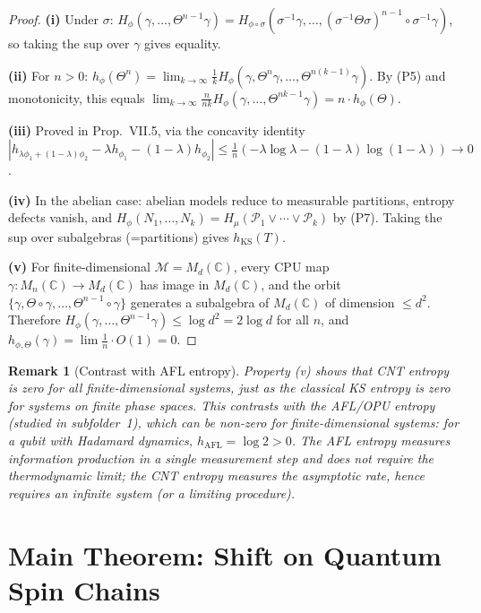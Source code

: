 \documentclass[12pt,a4paper]{article}
\newtheorem{remark}[theorem]{Remark}
\newcommand{\CC}{\mathbb{C}}
\newcommand{\Mn}{M_n(\CC)}
\newcommand{\Md}{M_d(\CC)}
\newcommand{\vN}{\mathcal{M}}      %
\newcommand{\thetaaut}{\Theta}
\newcommand{\Hphi}{H_{\phi}}
\newcommand{\hphi}{h_{\phi}}
\begin{document}
\begin{proof}
\textbf{(i)} Under $\sigma$: $\Hphi(\gamma,\ldots,\thetaaut^{n-1}\gamma)=
H_{\phi\circ\sigma}(\sigma^{-1}\gamma,\ldots,(\sigma^{-1}\thetaaut\sigma)^{n-1}\circ\sigma^{-1}\gamma)$,
so taking the sup over $\gamma$ gives equality.

\textbf{(ii)} For $n>0$: $h_\phi(\thetaaut^n)=\lim_{k\to\infty}\frac{1}{k}
\Hphi(\gamma,\thetaaut^n\gamma,\ldots,\thetaaut^{n(k-1)}\gamma)$.  By (P5) and
monotonicity, this equals $\lim_{k\to\infty}\frac{n}{nk}\Hphi(\gamma,\ldots,\thetaaut^{nk-1}\gamma)
=n\cdot\hphi(\thetaaut)$.

\textbf{(iii)} Proved in \cite{cnt87} Prop.~VII.5, via the concavity identity
$|h_{\lambda\phi_1+(1-\lambda)\phi_2}-\lambda h_{\phi_1}-(1-\lambda)h_{\phi_2}|
\le\frac{1}{n}(-\lambda\log\lambda-(1-\lambda)\log(1-\lambda))\to 0$.

\textbf{(iv)} In the abelian case: abelian models reduce to measurable partitions, entropy
defects vanish, and $\Hphi(N_1,\ldots,N_k)=H_\mu(\mathcal{P}_1\vee\cdots\vee\mathcal{P}_k)$ by (P7).
Taking the sup over subalgebras (=partitions) gives $h_{\mathrm{KS}}(T)$.

\textbf{(v)} For finite-dimensional $\vN=\Md$, every CPU map $\gamma:\Mn\to\Md$ has image
in $\Md$, and the orbit $\{\gamma,\thetaaut\circ\gamma,\ldots,\thetaaut^{n-1}\circ\gamma\}$
generates a subalgebra of $\Md$ of dimension $\le d^2$.  Therefore
$\Hphi(\gamma,\ldots,\thetaaut^{n-1}\gamma)\le\log d^2=2\log d$ for all $n$, and
$h_{\phi,\thetaaut}(\gamma)=\lim\frac{1}{n}\cdot O(1)=0$.
\end{proof}

\begin{remark}[Contrast with AFL entropy]\label{rmk:cnt_vs_afl}
Property (v) shows that CNT entropy is zero for all finite-dimensional systems, just
as the classical KS entropy is zero for systems on finite phase spaces.  This contrasts
with the AFL/OPU entropy (studied in subfolder~1), which can be non-zero for finite-dimensional
systems: for a qubit with Hadamard dynamics, $h_{\mathrm{AFL}}=\log 2>0$.
The AFL entropy measures information production in a single measurement step and does not
require the thermodynamic limit; the CNT entropy measures the asymptotic rate, hence
requires an infinite system (or a limiting procedure).
\end{remark}

\section{Main Theorem: Shift on Quantum Spin Chains}
\label{sec:spinchain}
\end{document}
